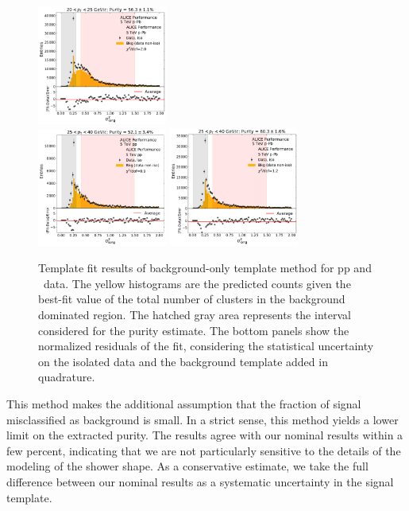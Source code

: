 \begin{figure}[h]
\includegraphics[width=0.38\textwidth]{Purity/bf-example-p-Pb-cluster_Lambda-20-25.pdf}
\\
\includegraphics[width=0.38\textwidth]{Purity/bf-example-pp-cluster_Lambda-25-40.pdf}
\includegraphics[width=0.38\textwidth]{Purity/bf-example-p-Pb-cluster_Lambda-25-40.pdf}
\caption{Template fit results of background-only template method for pp and \pPb~data. The yellow histograms are the predicted counts given the best-fit value of the total number of clusters in the background dominated region. The hatched gray area represents the interval considered for the purity estimate. The bottom panels show the normalized residuals of the fit, considering the statistical uncertainty on the isolated data and the background template added in quadrature. }
\label{BkgOnlyFit_pPb}
\end{figure}

This method makes the additional assumption that the fraction of signal misclassified as background is small. In a strict sense, this method yields a lower limit on the extracted purity. The results agree with our nominal results within a few percent, indicating that we are not particularly sensitive to the details of the modeling of the shower shape. As a conservative estimate, we take the full difference between our nominal results as a systematic uncertainty in the signal template.

